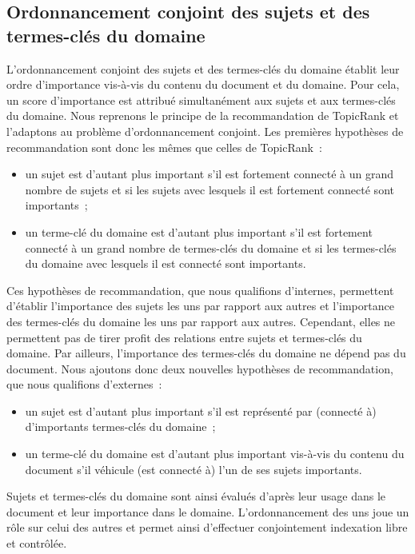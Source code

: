   \subsection{Ordonnancement conjoint des sujets et des termes-clés du domaine}
  \label{subsec:main-domain_specific_keyphrase_annotation-supervised_automatic_keyphrase_extraction-topiccorank-co_ranking}
    L'ordonnancement conjoint des sujets et des termes-clés du domaine
    établit leur ordre d'importance vis-à-vis du contenu du document et du
    domaine. Pour cela, un score d'importance est attribué simultanément aux
    sujets et aux termes-clés du domaine.
%
    Nous reprenons le principe de la recommandation de TopicRank et
    l'adaptons au problème d'ordonnancement conjoint. Les premières
    hypothèses de recommandation sont donc les mêmes que celles de
    TopicRank~:
    \begin{itemize}
      \item{un sujet est d'autant plus important s'il est fortement connecté
            à un grand nombre de sujets et si les sujets avec lesquels il
            est fortement connecté sont importants~;}
      \item{un terme-clé du domaine est d'autant plus important s'il est
            fortement connecté à un grand nombre de termes-clés du domaine
            et si les termes-clés du domaine avec lesquels il est connecté
            sont importants.}
    \end{itemize}
    Ces hypothèses de recommandation, que nous qualifions d'internes,
    permettent d'établir l'importance des sujets les uns par rapport aux
    autres et l'importance des termes-clés du domaine les uns par rapport
    aux autres. Cependant, elles ne permettent pas de tirer profit des
    relations entre sujets et termes-clés du domaine. Par ailleurs,
    l'importance des termes-clés du domaine ne  dépend pas du document. Nous
    ajoutons donc deux nouvelles hypothèses de recommandation, que nous
    qualifions d'externes~:
    \begin{itemize}
      \item{un sujet est d'autant plus important s'il est représenté par
            (connecté à) d'importants termes-clés du domaine~;}
      \item{un terme-clé du domaine est d'autant plus important vis-à-vis
            du contenu du document s'il véhicule (est connecté à) l'un de
            ses sujets importants.}
    \end{itemize}
    Sujets et termes-clés du domaine sont ainsi évalués d'après leur usage
    dans le document et leur importance dans le domaine. L'ordonnancement
    des uns joue un rôle sur celui des autres et permet ainsi d'effectuer
    conjointement indexation libre et contrôlée.

